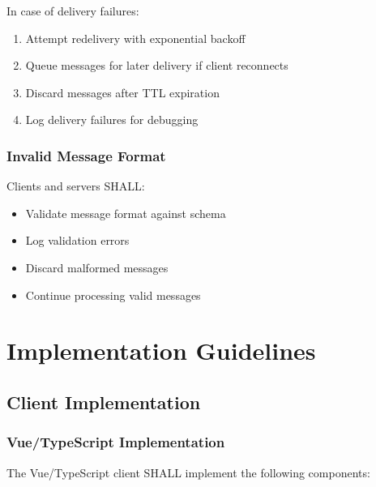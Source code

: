 \documentclass[12pt,a4paper]{article}
\begin{document}
In case of delivery failures:

\begin{enumerate}
\item Attempt redelivery with exponential backoff
\item Queue messages for later delivery if client reconnects
\item Discard messages after TTL expiration
\item Log delivery failures for debugging
\end{enumerate}

\subsubsection{Invalid Message Format}

Clients and servers SHALL:

\begin{itemize}
\item Validate message format against schema
\item Log validation errors
\item Discard malformed messages
\item Continue processing valid messages
\end{itemize}

\section{Implementation Guidelines}

\subsection{Client Implementation}

\subsubsection{Vue/TypeScript Implementation}

The Vue/TypeScript client SHALL implement the following components:
\end{document}

